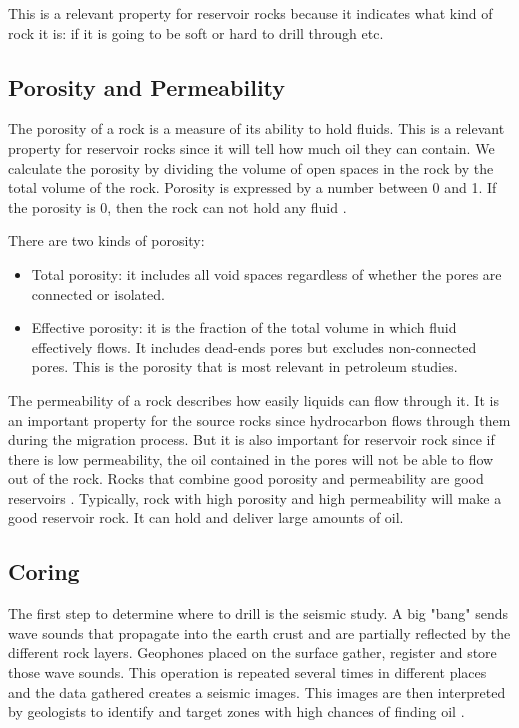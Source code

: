 This is a relevant property for reservoir rocks because it indicates what kind of rock it is: if it is going to be soft or hard to drill through etc.

\subsection{Porosity and Permeability}

The porosity of a rock is a measure of its ability to hold fluids. This is a relevant property for reservoir rocks since it will tell how much oil they can contain. We calculate the porosity by dividing the volume of open spaces in the rock by the total volume of the rock. Porosity is expressed by a number between 0 and 1. If the porosity is 0, then the rock can not hold any fluid \cite{oilbegin}. 
 
There are two kinds of porosity:
\begin{itemize}
    \item Total porosity: it includes all void spaces regardless of whether the pores are connected or isolated.
    \item Effective porosity: it is the fraction of the total volume in which fluid effectively flows. It includes dead-ends pores but excludes non-connected pores. This is the porosity that is most relevant in petroleum studies. 
\end{itemize}

The permeability of a rock describes how easily liquids can flow through it. It is an important property for the source rocks since hydrocarbon flows through them during the migration process. But it is also important for reservoir rock since if there is low permeability, the oil contained in the pores will not be able to flow out of the rock. 
Rocks that  combine good porosity and permeability are good reservoirs . Typically, rock with high porosity and high permeability will make a good reservoir rock. It can hold and deliver large amounts of oil. 

\subsection{Coring}\label{sec:coring}
The first step to determine where to drill is the seismic study. A big "bang" sends wave sounds that propagate into the earth crust and are partially reflected by the different rock layers. Geophones placed on the surface gather, register and store those wave sounds. This operation is repeated several times in different places and the data gathered creates a seismic images. This images are then interpreted by geologists to identify and target zones with high chances of finding oil \cite{oilbegin}. 


